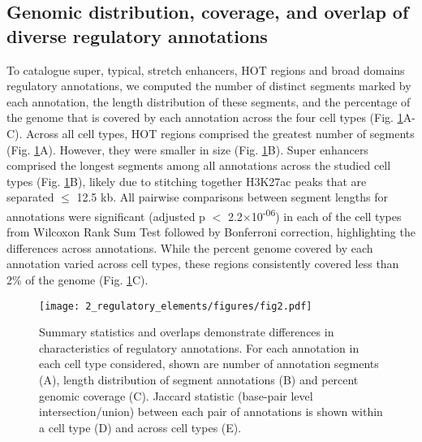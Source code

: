 \subsection{Genomic distribution, coverage, and overlap of diverse regulatory annotations}
To catalogue super, typical, stretch enhancers, HOT regions and broad domains regulatory annotations, we computed the number of distinct segments marked by each annotation, the length distribution of these segments, and the percentage of the genome that is covered by each annotation across the four cell types (Fig. \ref{fig:c1_f2}A-C). Across all cell types, HOT regions comprised the greatest number of segments (Fig. \ref{fig:c1_f2}A). However, they were smaller in size (Fig. \ref{fig:c1_f2}B). Super enhancers comprised the longest segments among all annotations across the studied cell types (Fig. \ref{fig:c1_f2}B), likely due to stitching together H3K27ac peaks that are separated $\leq$ 12.5 kb. All pairwise comparisons between segment lengths for annotations were significant (adjusted p $<$ 2.2$\times$10\textsuperscript{-06}) in each of the cell types from Wilcoxon Rank Sum Test followed by Bonferroni correction, highlighting the differences across annotations. While the percent genome covered by each annotation varied across cell types, these regions consistently covered less than 2\% of the genome (Fig. \ref{fig:c1_f2}C). \\

\begin{figure}
    \centering
    \texttt{[image: 2\_regulatory\_elements/figures/fig2.pdf]}
    \caption{Summary statistics and overlaps demonstrate differences in characteristics of regulatory annotations. For each annotation in each cell type considered, shown are number of annotation segments (A), length distribution of segment annotations (B) and percent genomic coverage (C). Jaccard statistic (base-pair level intersection/union) between each pair of annotations is shown within a cell type (D) and across cell types (E).}
    \label{fig:c1_f2}
\end{figure}

